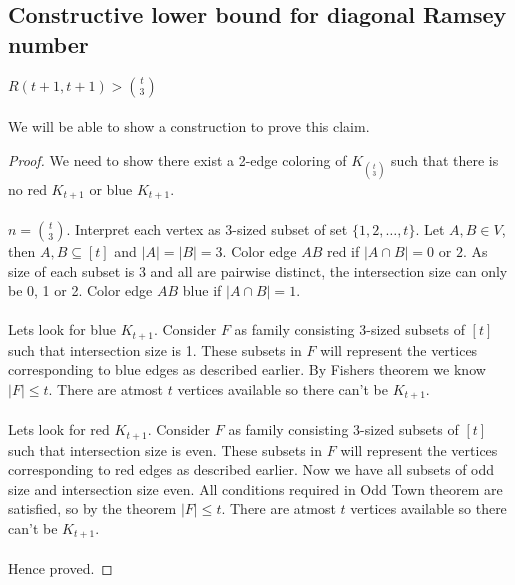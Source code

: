 \subsection{Constructive lower bound for diagonal Ramsey number}
\begin{claim}
$R(t+1,t+1)> {t\choose 3}$\\\\
We will be able to show a construction to prove this claim.
\begin{proof}
We need to show there exist a 2-edge coloring of $K_{t\choose 3}$ such that there is no red $K_{t+1}$ or blue $K_{t+1}$.\\\\
$n={t\choose 3}$. Interpret each vertex as 3-sized subset of set $\{1, 2, \hdots, t\}$. Let $A,B \in V$, then $A,B \subseteq [t]$ and $|A|=|B|=3$. Color edge $AB$ red if $|A\cap B| =0$ or $2$. As size of each subset is 3 and all are pairwise distinct, the intersection size can only be 0, 1 or 2. Color edge $AB$ blue if $|A\cap B| =1$.\\\\
Lets look for blue $K_{t+1}$. Consider $F$ as family consisting 3-sized subsets of $[t]$ such that intersection size is 1. These subsets in $F$ will represent the vertices corresponding to blue edges as described earlier. By Fishers theorem we know $|F|\le t$. There are atmost $t$ vertices available so there can't be $K_{t+1}$.\\\\
Lets look for red $K_{t+1}$. Consider $F$ as family consisting 3-sized subsets of $[t]$ such that intersection size is even. These subsets in $F$ will represent the vertices corresponding to red edges as described earlier. Now we have all subsets of odd size and intersection size even. All conditions required in Odd Town theorem are satisfied, so by the theorem $|F|\le t$. There are atmost $t$ vertices available so there can't be $K_{t+1}$.\\\\
Hence proved.
\end{proof}
\end{claim}

